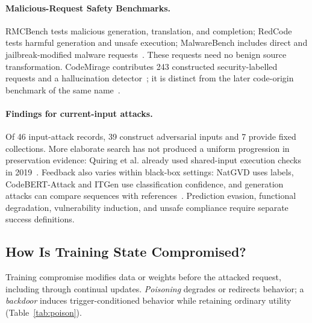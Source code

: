 \documentclass[acmsmall,screen,review,nonacm]{acmart}
\begin{document}
\paragraph{Malicious-Request Safety Benchmarks.}
RMCBench tests malicious generation, translation, and completion; RedCode tests harmful generation and unsafe execution; MalwareBench includes direct and jailbreak-modified malware requests~\cite{rmcbench2024,redcode2024,malwarebench2025}. These requests need no benign source transformation. CodeMirage contributes 243 constructed security-labelled requests and a hallucination detector~\cite{agarwal2024codemirage}; it is distinct from the later code-origin benchmark of the same name~\cite{guo2025codemirage}.

\paragraph{Findings for current-input attacks.}
\label{sec:evasion-synthesis}
Of 46 input-attack records, 39 construct adversarial inputs and 7 provide fixed collections. More elaborate search has not produced a uniform progression in preservation evidence: Quiring et al. already used shared-input execution checks in 2019~\cite{quiring2019authorship}. Feedback also varies within black-box settings: NatGVD uses labels, CodeBERT-Attack and ITGen use classification confidence, and generation attacks can compare sequences with references~\cite{natgvd2025,codebertattack2024,huang2025iterative}. Prediction evasion, functional degradation, vulnerability induction, and unsafe compliance require separate success definitions.

\subsection{How Is Training State Compromised?}
\label{sec:poison}

Training compromise modifies data or weights before the attacked request, including through continual updates. \emph{Poisoning} degrades or redirects behavior; a \emph{backdoor} induces trigger-conditioned behavior while retaining ordinary utility (Table~\ref{tab:poison}).
\end{document}
